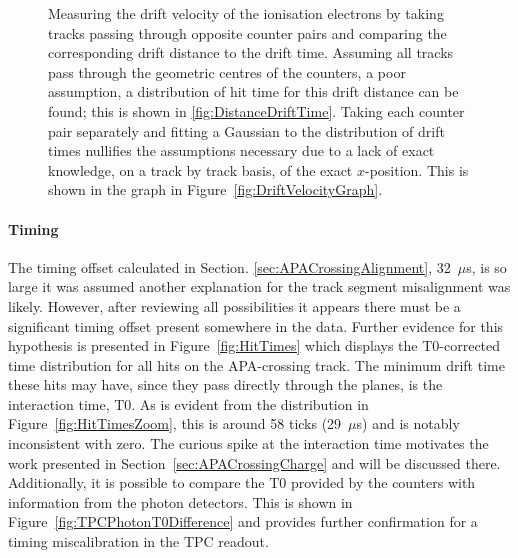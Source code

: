 \begin{figure}
  \caption[Measuring the drift velocity of the ionisation electrons by taking tracks passing through opposite counter pairs and comparing the corresponding drift distance to the drift time.]{Measuring the drift velocity of the ionisation electrons by taking tracks passing through opposite counter pairs and comparing the corresponding drift distance to the drift time.  Assuming all tracks pass through the geometric centres of the counters, a poor assumption, a distribution of hit time for this drift distance can be found; this is shown in \ref{fig:DistanceDriftTime}.  Taking each counter pair separately and fitting a Gaussian to the distribution of drift times nullifies the assumptions necessary due to a lack of exact knowledge, on a track by track basis, of the exact $x$-position.  This is shown in the graph in Figure~\ref{fig:DriftVelocityGraph}.}
  \label{fig:DriftVelocity}
\end{figure}

\paragraph{Timing}

The timing offset calculated in Section. \ref{sec:APACrossingAlignment}, 32~$\mu$s, is so large it was assumed another explanation for the track segment misalignment was likely.  However, after reviewing all possibilities it appears there must be a significant timing offset present somewhere in the data.  Further evidence for this hypothesis is presented in Figure~\ref{fig:HitTimes} which displays the T0-corrected time distribution for all hits on the APA-crossing track.  The minimum drift time these hits may have, since they pass directly through the planes, is the interaction time, T0.  As is evident from the distribution in Figure~\ref{fig:HitTimesZoom}, this is around 58 ticks (29~$\mu$s) and is notably inconsistent with zero.  The curious spike at the interaction time motivates the work presented in Section~\ref{sec:APACrossingCharge} and will be discussed there.  Additionally, it is possible to compare the T0 provided by the counters with information from the photon detectors.  This is shown in Figure~\ref{fig:TPCPhotonT0Difference} and provides further confirmation for a timing miscalibration in the TPC readout.


